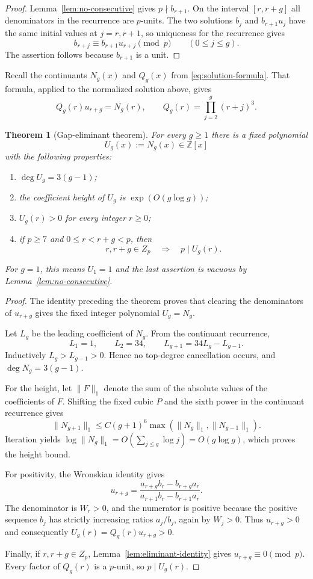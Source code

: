 \documentclass[11pt]{amsart}
\newcommand{\Z}{\mathbb{Z}}
\theoremstyle{plain}
\newtheorem{theorem}{Theorem}
\theoremstyle{remark}
\begin{document}
\begin{proof}
Lemma~\ref{lem:no-consecutive} gives $p\nmid b_{r+1}$.  On the interval
$[r,r+g]$ all denominators in the recurrence are $p$-units.  The two
solutions $b_j$ and $b_{r+1}u_j$ have the same initial values at
$j=r,r+1$, so uniqueness for the recurrence gives
\[
 b_{r+j}\equiv b_{r+1}u_{r+j}\pmod p
 \qquad(0\leq j\leq g).
\]
The assertion follows because $b_{r+1}$ is a unit.
\end{proof}

Recall the continuants $N_g(x)$ and $Q_g(x)$ from
\eqref{eq:solution-formula}.  That formula, applied to the normalized
solution above, gives
\[
 Q_g(r)u_{r+g}=N_g(r),
 \qquad
 Q_g(r)=\prod_{j=2}^g(r+j)^3.
\]

\begin{theorem}[Gap-eliminant theorem]\label{thm:Ug}
For every $g\geq1$ there is a fixed polynomial
\[
 U_g(x):=N_g(x)\in\Z[x]
\]
with the following properties:
\begin{enumerate}
\item $\deg U_g=3(g-1)$;
\item the coefficient height of $U_g$ is
$\exp(O(g\log g))$;
\item $U_g(r)>0$ for every integer $r\geq0$;
\item if $p\geq7$ and $0\leq r<r+g<p$, then
\[
 r,r+g\in Z_p\quad\Longrightarrow\quad p\mid U_g(r).
\]
\end{enumerate}
For $g=1$, this means $U_1=1$ and the last assertion is vacuous by
Lemma~\ref{lem:no-consecutive}.
\end{theorem}

\begin{proof}
The identity preceding the theorem proves that clearing the denominators
of $u_{r+g}$ gives the fixed integer polynomial $U_g=N_g$.

Let $L_g$ be the leading coefficient of $N_g$.  From the continuant
recurrence,
\[
 L_1=1,\qquad L_2=34,\qquad L_{g+1}=34L_g-L_{g-1}.
\]
Inductively $L_g>L_{g-1}>0$.  Hence no top-degree cancellation occurs,
and $\deg N_g=3(g-1)$.

For the height, let $\|F\|_1$ denote the sum of the absolute values of
the coefficients of $F$.  Shifting the fixed cubic $P$ and the sixth
power in the continuant recurrence gives
\[
 \|N_{g+1}\|_1
 \leq C(g+1)^6\max(\|N_g\|_1,\|N_{g-1}\|_1).
\]
Iteration yields
$\log\|N_g\|_1=O(\sum_{j\leq g}\log j)=O(g\log g)$, which proves the
height bound.

For positivity, the Wronskian identity gives
\[
 u_{r+g}
 =\frac{a_{r+g}b_r-b_{r+g}a_r}
 {a_{r+1}b_r-b_{r+1}a_r}.
\]
The denominator is $W_r>0$, and the numerator is positive because the
positive sequence $b_j$ has strictly increasing ratios $a_j/b_j$, again
by $W_j>0$.  Thus $u_{r+g}>0$ and consequently
$U_g(r)=Q_g(r)u_{r+g}>0$.

Finally, if $r,r+g\in Z_p$, Lemma~\ref{lem:eliminant-identity} gives
$u_{r+g}\equiv0\pmod p$.  Every factor of $Q_g(r)$ is a $p$-unit, so
$p\mid U_g(r)$.
\end{proof}
\end{document}
